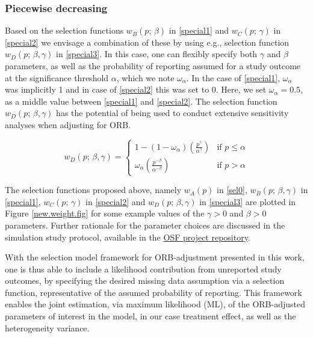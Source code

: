 \documentclass[twocolumn]{article}\usepackage[]{graphicx}\usepackage[]{xcolor}
\begin{document}
\bigskip

\subsubsection{Piecewise decreasing}

Based on the selection functions $w_B(p \text{; } \beta)$ in \eqref{special1} and $w_C(p \text{; } \gamma)$ in \eqref{special2} we  envisage a combination of these by using e.g., selection function $w_D(p \text{; } \beta, \gamma)$ in \eqref{special3}. In this case, one can flexibly specify both $\gamma$ and $\beta$ parameters, as well as the probability of reporting assumed for a study outcome at the significance threshold $\alpha$, which we note $\omega_{\alpha}$. In the case of \eqref{special1}, $\omega_{\alpha}$ was implicitly 1 and in case of \eqref{special2} this was set to 0. Here, we set $\omega_{\alpha}=0.5$, as a middle value between \eqref{special1} and \eqref{special2}. The selection function $w_D(p \text{; } \beta, \gamma)$ has the potential of being used to conduct extensive sensitivity analyses when adjusting for ORB.

\bigskip

\begin{equation}
w_D(p \text{; } \beta, \gamma) = 
\begin{cases}
1 - (1-\omega_{\alpha})\left(\frac{p^{\gamma}}{\alpha^{\gamma}}\right) & \text{if } p \leq \alpha \\
\omega_{\alpha}\left(\frac{p^{-\beta}}{\alpha^{-\beta}}\right) & \text{if } p > \alpha
\end{cases}
\label{special3}
\end{equation}

\bigskip

The selection functions proposed above, namely $w_A(p)$ in \eqref{sel0}, $w_B(p \text{; } \beta, \gamma)$ in \eqref{special1}, $w_C(p \text{; } \gamma)$ in \eqref{special2} and $w_D(p \text{; } \beta, \gamma)$ in \eqref{special3} are plotted in Figure \ref{new.weight.fig} for some example values of the $\gamma > 0$ and $\beta > 0$ parameters. Further rationale for the parameter choices are discussed in the simulation study protocol, available in the \href{https://osf.io/ancdu/}{OSF project repository}.

\bigskip

With the selection model framework for ORB-adjustment presented in this work, one is thus able to include a likelihood contribution from unreported study outcomes, by specifying the desired missing data assumption via a selection function, representative of the assumed probability of reporting. This framework enables the joint estimation, via maximum likelihood (ML), of the ORB-adjusted parameters of interest in the model, in our case treatment effect, as well as the heterogeneity variance.
\end{document}
